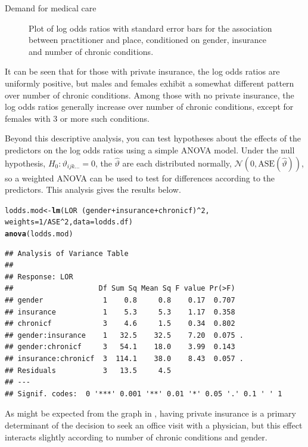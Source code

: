 \documentclass[11pt]{book}\usepackage[]{graphicx}\usepackage[]{color}
\makeatletter
\newcommand{\hlnum}[1]{\textcolor[rgb]{0.686,0.059,0.569}{#1}}%
\newcommand{\hlopt}[1]{\textcolor[rgb]{0,0,0}{#1}}%
\newcommand{\hlstd}[1]{\textcolor[rgb]{0.345,0.345,0.345}{#1}}%
\newcommand{\hlkwb}[1]{\textcolor[rgb]{0.69,0.353,0.396}{#1}}%
\newcommand{\hlkwc}[1]{\textcolor[rgb]{0.333,0.667,0.333}{#1}}%
\newcommand{\hlkwd}[1]{\textcolor[rgb]{0.737,0.353,0.396}{\textbf{#1}}}%
\newenvironment{kframe}{%
 \def\at@end@of@kframe{}%
 \ifinner\ifhmode%
  \def\at@end@of@kframe{\end{minipage}}%
  \begin{minipage}{\columnwidth}%
 \fi\fi%
 \def\FrameCommand##1{\hskip\@totalleftmargin \hskip-\fboxsep
 \colorbox{shadecolor}{##1}\hskip-\fboxsep
     \hskip-\linewidth \hskip-\@totalleftmargin \hskip\columnwidth}%
 \MakeFramed {\advance\hsize-\width
   \@totalleftmargin\z@ \linewidth\hsize
   \@setminipage}}%
 {\par\unskip\endMakeFramed%
 \at@end@of@kframe}
\newenvironment{knitrout}{}{} %
\renewenvironment{knitrout}{\small\renewcommand{\baselinestretch}{.85}}{} %
\makeatother
\begin{document}
\begin{Example}[nmes4]{Demand for medical care}
\begin{knitrout}
\begin{figure}[!htbp]
\caption[Plot of log odds ratios with standard error bars for the association between practitioner and place, conditioned on gender, insurance and number of chronic conditions]{Plot of log odds ratios with standard error bars for the association between practitioner and place, conditioned on gender, insurance and number of chronic conditions.\label{fig:nmes4-loddsratio}}
\end{figure}


\end{knitrout}
\noindent It can be seen that for those with private insurance, the log odds ratios are uniformly positive, but
males and females exhibit a somewhat different pattern over number of chronic conditions.
Among those with no private insurance, the log odds ratios generally increase over number of chronic conditions,
except for females with 3 or more such conditions.

Beyond this descriptive analysis, you can test hypotheses about the effects of the predictors on the log odds
ratios using a simple ANOVA model.
Under the null hypothesis, $H_0 : \vartheta_{ijk\dots} = 0$, the
$\widehat{\vartheta}$ are each distributed normally, $\mathcal{N} (0, \mathrm{ASE}(\widehat{\vartheta}))$,
so a weighted ANOVA can be used to test for differences according to the predictors.
This analysis gives the results below.
\begin{knitrout}
\color{fgcolor}\begin{kframe}
\begin{alltt}
\hlstd{lodds.mod} \hlkwb{<-} \hlkwd{lm}\hlstd{(LOR} \hlopt{~} \hlstd{(gender} \hlopt{+} \hlstd{insurance} \hlopt{+} \hlstd{chronicf)}\hlopt{^}\hlnum{2}\hlstd{,}
                \hlkwc{weights}\hlstd{=}\hlnum{1}\hlopt{/}\hlstd{ASE}\hlopt{^}\hlnum{2}\hlstd{,} \hlkwc{data}\hlstd{=lodds.df)}
\hlkwd{anova}\hlstd{(lodds.mod)}
\end{alltt}
\begin{verbatim}
## Analysis of Variance Table
## 
## Response: LOR
##                    Df Sum Sq Mean Sq F value Pr(>F)  
## gender              1    0.8     0.8    0.17  0.707  
## insurance           1    5.3     5.3    1.17  0.358  
## chronicf            3    4.6     1.5    0.34  0.802  
## gender:insurance    1   32.5    32.5    7.20  0.075 .
## gender:chronicf     3   54.1    18.0    3.99  0.143  
## insurance:chronicf  3  114.1    38.0    8.43  0.057 .
## Residuals           3   13.5     4.5                 
## ---
## Signif. codes:  0 '***' 0.001 '**' 0.01 '*' 0.05 '.' 0.1 ' ' 1
\end{verbatim}
\end{kframe}
\end{knitrout}
As might be expected from the graph in , having private insurance
is a primary determinant of the decision to seek an office visit with a physician, but this
effect interacts slightly according to number of chronic conditions and gender.

\end{Example}
\end{document}
